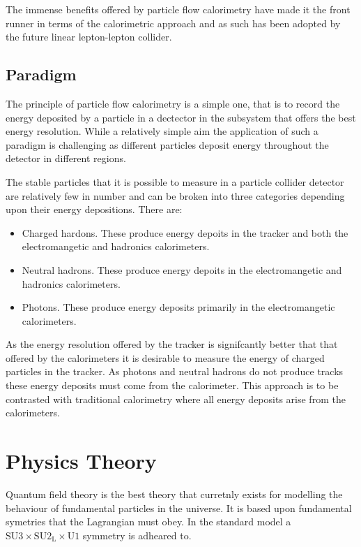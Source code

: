 The immense benefits offered by particle flow calorimetry have made it the front runner in terms of the calorimetric approach and as such has been adopted by the future linear lepton-lepton collider.  

\subsection{Paradigm}

The principle of particle flow calorimetry is a simple one, that is to record the energy deposited by a particle in a dectector in the subsystem that offers the best energy resolution.  While a relatively simple aim the application of such a paradigm is challenging as different particles deposit energy throughout the detector in different regions.  

The stable particles that it is possible to measure in a particle collider detector are relatively few in number and can be broken into three categories depending upon their energy depositions.  There are:

\begin{itemize}
\item Charged hardons.  These produce energy depoits in the tracker and both the electromangetic and hadronics calorimeters.
\item Neutral hadrons.  These produce energy depoits in the electromangetic and hadronics calorimeters.
\item Photons.  These produce energy deposits primarily in the electromangetic calorimeters. 
\end{itemize}

As the energy resolution offered by the tracker is signifcantly better that that offered by the calorimeters it is desirable to measure the energy of charged particles in the tracker.  As photons and neutral hadrons do not produce tracks these energy deposits must come from the calorimeter.  This approach is to be contrasted with traditional calorimetry where all energy deposits arise from the calorimeters.  


\section{Physics Theory}

Quantum field theory is the best theory that curretnly exists for modelling the behaviour of fundamental particles in the universe.  It is based upon fundamental symetries that the Lagrangian must obey.  In the standard model a $\text{SU}3 \times \text{SU}2_{\text{L}} \times \text{U}1$ symmetry is adheared to.

